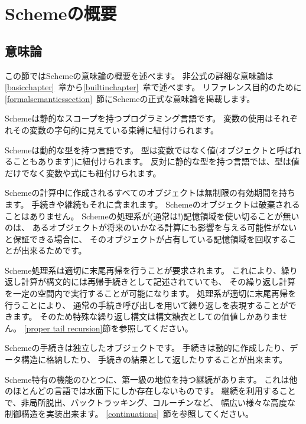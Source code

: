 
\chapter{Schemeの概要}

\section{意味論}
\label{semanticsection}

この節ではSchemeの意味論の概要を述べます。
非公式の詳細な意味論は\ref{basicchapter}~章から\ref{builtinchapter}~章で述べます。
リファレンス目的のために\ref{formalsemanticssection}~節にSchemeの正式な意味論を掲載します。

\vest Schemeは静的なスコープを持つプログラミング言語です。
変数の使用はそれぞれその変数の字句的に見えている束縛に紐付けられます。

\vest Schemeは動的な型を持つ言語です。
型は変数ではなく値(オブジェクトと呼ばれることもあります)に紐付けられます。
反対に静的な型を持つ言語では、型は値だけでなく変数や式にも紐付けられます。

\vest Schemeの計算中に作成されるすべてのオブジェクトは無制限の有効期間を持ちます。
手続きや継続もそれに含まれます。
Schemeのオブジェクトは破棄されることはありません。
Schemeの処理系が(通常は!)記憶領域を使い切ることが無いのは、
あるオブジェクトが将来のいかなる計算にも影響を与える可能性がないと保証できる場合に、
そのオブジェクトが占有している記憶領域を回収することが出来るためです。

\vest Scheme処理系は適切に末尾再帰を行うことが要求されます。
これにより、繰り返し計算が構文的には再帰手続きとして記述されていても、
その繰り返し計算を一定の空間内で実行することが可能になります。
処理系が適切に末尾再帰を行うことにより、
通常の手続き呼び出しを用いて繰り返しを表現することができます。
そのため特殊な繰り返し構文は構文糖衣としての価値しかありません。
\ref{proper tail recursion}節を参照してください。

\vest Schemeの手続きは独立したオブジェクトです。
手続きは動的に作成したり、データ構造に格納したり、
手続きの結果として返したりすることが出来ます。

\vest Scheme特有の機能のひとつに、第一級の地位を持つ継続があります。
これは他のほとんどの言語では水面下にしか存在しないものです。
継続を利用することで、非局所脱出、バックトラッキング、コルーチンなど、
幅広い様々な高度な制御構造を実装出来ます。
\ref{continuations}~節を参照してください。

